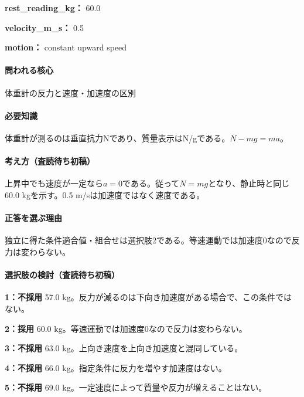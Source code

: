 \noindent\textbf{rest\_reading\_kg：} 60.0\par

\noindent\textbf{velocity\_m\_s：} 0.5\par

\noindent\textbf{motion：} constant upward speed\par

\paragraph{問われる核心} 体重計の反力と速度・加速度の区別

\paragraph{必要知識} 体重計が測るのは垂直抗力Nであり、質量表示はN/gである。\(N-mg=ma\)。

\paragraph{考え方（査読待ち初稿）} 上昇中でも速度が一定なら\(a=0\)である。従って\(N=mg\)となり、静止時と同じ60.0 kgを示す。0.5 m/sは加速度ではなく速度である。

\paragraph{正答を選ぶ理由} 独立に得た条件適合値・組合せは選択肢2である。等速運動では加速度0なので反力は変わらない。

\paragraph{選択肢の検討（査読待ち初稿）}\mbox{}\par

\noindent\textbf{1：不採用} 57.0 kg。反力が減るのは下向き加速度がある場合で、この条件ではない。\par

\noindent\textbf{2：採用} 60.0 kg。等速運動では加速度0なので反力は変わらない。\par

\noindent\textbf{3：不採用} 63.0 kg。上向き速度を上向き加速度と混同している。\par

\noindent\textbf{4：不採用} 66.0 kg。指定条件に反力を増やす加速度はない。\par

\noindent\textbf{5：不採用} 69.0 kg。一定速度によって質量や反力が増えることはない。\par

